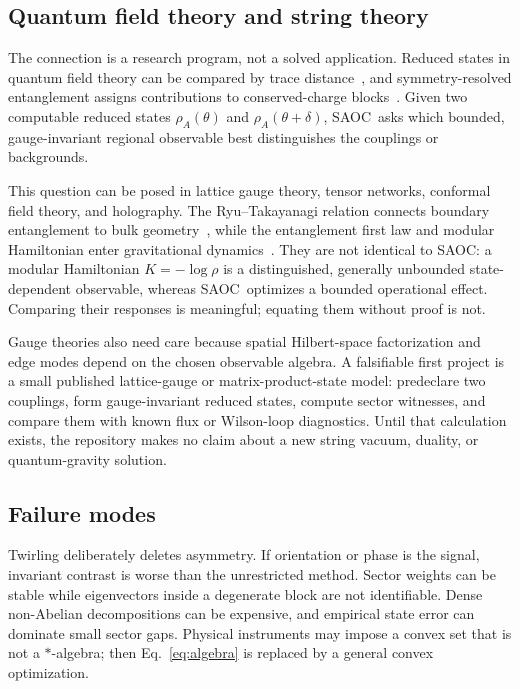 \documentclass[letterpaper,journal]{IEEEtran}
\newcommand{\SAOC}{\textsc{SAOC}}
\begin{document}
\subsection{Quantum field theory and string theory}

The connection is a research program, not a solved application. Reduced states
in quantum field theory can be compared by trace distance~\cite{zhang2019},
and symmetry-resolved entanglement assigns contributions to conserved-charge
blocks~\cite{goldstein2018}. Given two computable reduced states
$\rho_A(\theta)$ and $\rho_A(\theta+\delta)$, \SAOC\ asks which bounded,
gauge-invariant regional observable best distinguishes the couplings or
backgrounds.

This question can be posed in lattice gauge theory, tensor networks, conformal
field theory, and holography. The Ryu--Takayanagi relation connects boundary
entanglement to bulk geometry~\cite{ryu2006}, while the entanglement first law
and modular Hamiltonian enter gravitational dynamics~\cite{lashkari2014}.
They are not identical to \SAOC: a modular Hamiltonian
$K=-\log\rho$ is a distinguished, generally unbounded state-dependent
observable, whereas \SAOC\ optimizes a bounded operational effect. Comparing
their responses is meaningful; equating them without proof is not.

Gauge theories also need care because spatial Hilbert-space factorization and
edge modes depend on the chosen observable algebra. A falsifiable first
project is a small published lattice-gauge or matrix-product-state model:
predeclare two couplings, form gauge-invariant reduced states, compute sector
witnesses, and compare them with known flux or Wilson-loop diagnostics. Until
that calculation exists, the repository makes no claim about a new string
vacuum, duality, or quantum-gravity solution.

\subsection{Failure modes}

Twirling deliberately deletes asymmetry. If orientation or phase is the
signal, invariant contrast is worse than the unrestricted method. Sector
weights can be stable while eigenvectors inside a degenerate block are not
identifiable. Dense non-Abelian decompositions can be expensive, and
empirical state error can dominate small sector gaps. Physical instruments
may impose a convex set that is not a $*$-algebra; then
Eq.~\eqref{eq:algebra} is replaced by a general convex optimization.
\end{document}
